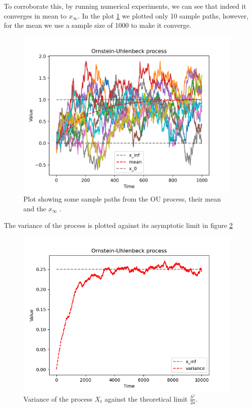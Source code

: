 \documentclass[a4paper,12pt]{article} %
\begin{document}
To corroborate this, by running numerical experiments, we can see that indeed it converges in mean to \(x_\infty \). In the plot \ref{fig:my_image} we plotted only 10 sample paths, however, for the mean we use a sample size of 1000 to make it converge.

\begin{figure}[h!]
    \centering
    \includegraphics[width=1\textwidth]{plots/ou_process.png} %
    \caption{Plot showing some sample paths from the OU process, their mean and the \(x_\infty \) .}
    \label{fig:my_image}
\end{figure}

The variance of the process is plotted against its asymptotic limit in figure \ref{fig:var}

\begin{figure}[h!]
    \centering
    \includegraphics[width=1\textwidth]{plots/variance.png} %
    \caption{Variance of the process \(X_t\) against the theoretical limit \(\frac{b^{2} }{2a}\).}
    \label{fig:var}
\end{figure}
\end{document}
